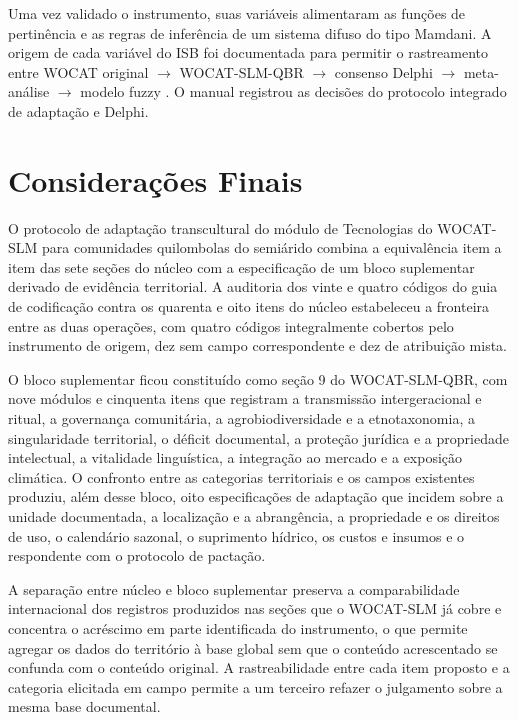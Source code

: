 \documentclass[preprint,authoryear,12pt]{elsarticle}
\begin{document}
Uma vez validado o instrumento, suas variáveis alimentaram as funções de pertinência e as regras de inferência de um sistema difuso do tipo Mamdani. A origem de cada variável do ISB foi documentada para permitir o rastreamento entre WOCAT original $\rightarrow$ WOCAT-SLM-QBR $\rightarrow$ consenso Delphi $\rightarrow$ meta-análise $\rightarrow$ modelo fuzzy \citep{Costanza1997}. O manual registrou as decisões do protocolo integrado de adaptação e Delphi.

\section{Considerações Finais}

O protocolo de adaptação transcultural do módulo de Tecnologias do WOCAT-SLM para comunidades quilombolas do semiárido combina a equivalência item a item das sete seções do núcleo com a especificação de um bloco suplementar derivado de evidência territorial. A auditoria dos vinte e quatro códigos do guia de codificação contra os quarenta e oito itens do núcleo estabeleceu a fronteira entre as duas operações, com quatro códigos integralmente cobertos pelo instrumento de origem, dez sem campo correspondente e dez de atribuição mista.

O bloco suplementar ficou constituído como seção 9 do WOCAT-SLM-QBR, com nove módulos e cinquenta itens que registram a transmissão intergeracional e ritual, a governança comunitária, a agrobiodiversidade e a etnotaxonomia, a singularidade territorial, o déficit documental, a proteção jurídica e a propriedade intelectual, a vitalidade linguística, a integração ao mercado e a exposição climática. O confronto entre as categorias territoriais e os campos existentes produziu, além desse bloco, oito especificações de adaptação que incidem sobre a unidade documentada, a localização e a abrangência, a propriedade e os direitos de uso, o calendário sazonal, o suprimento hídrico, os custos e insumos e o respondente com o protocolo de pactação.

A separação entre núcleo e bloco suplementar preserva a comparabilidade internacional dos registros produzidos nas seções que o WOCAT-SLM já cobre e concentra o acréscimo em parte identificada do instrumento, o que permite agregar os dados do território à base global sem que o conteúdo acrescentado se confunda com o conteúdo original. A rastreabilidade entre cada item proposto e a categoria elicitada em campo permite a um terceiro refazer o julgamento sobre a mesma base documental.
\end{document}
